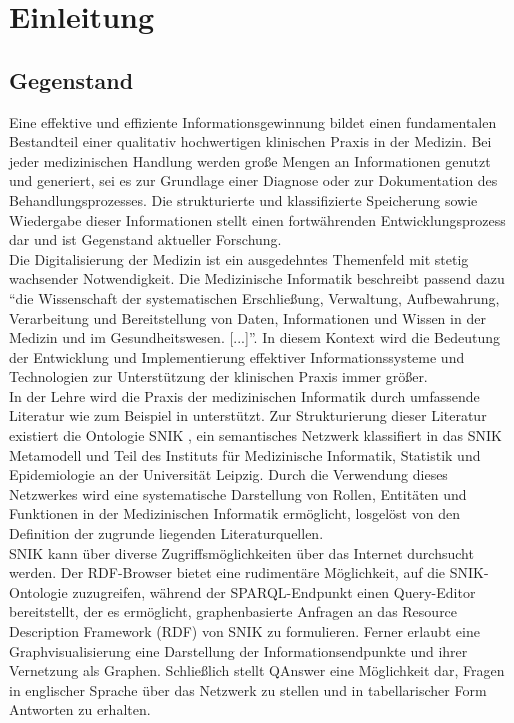 \chapter{Einleitung}\label{ch:introduction}
\section{Gegenstand}\label{sec:gegenstand}
Eine effektive und effiziente Informationsgewinnung bildet einen fundamentalen Bestandteil einer qualitativ hochwertigen klinischen Praxis in der Medizin. 
Bei jeder medizinischen Handlung werden große Mengen an Informationen genutzt und generiert, sei es zur Grundlage einer Diagnose oder zur Dokumentation des Behandlungsprozesses. 
Die strukturierte und klassifizierte Speicherung sowie Wiedergabe dieser Informationen stellt einen fortwährenden Entwicklungsprozess dar und ist Gegenstand aktueller Forschung.\\

Die Digitalisierung der Medizin ist ein ausgedehntes Themenfeld mit stetig wachsender Notwendigkeit. 
Die Medizinische Informatik beschreibt passend dazu \enquote{die Wissenschaft der systematischen Erschließung, Verwaltung, Aufbewahrung, Verarbeitung und Bereitstellung von Daten, Informationen und Wissen in der Medizin und im Gesundheitswesen. [...]}\citep{gmds}. 
In diesem Kontext wird die Bedeutung der Entwicklung und Implementierung effektiver Informationssysteme und Technologien zur Unterstützung der klinischen Praxis immer größer.\\

In der Lehre wird die Praxis der medizinischen Informatik durch umfassende Literatur wie zum Beispiel in \citet{bb} unterstützt. 
Zur Strukturierung dieser Literatur existiert die Ontologie SNIK \citep{snikgraphposter}, ein semantisches Netzwerk klassifiert in das SNIK Metamodell und Teil des Instituts für Medizinische Informatik, Statistik und Epidemiologie \citep{imise} an der Universität Leipzig.
Durch die Verwendung dieses Netzwerkes wird eine systematische Darstellung von Rollen, Entitäten und Funktionen in der Medizinischen Informatik ermöglicht, losgelöst von den Definition der zugrunde liegenden  Literaturquellen.\\

SNIK kann über diverse Zugriffsmöglichkeiten über das Internet durchsucht werden. Der RDF-Browser \citep{rfdbrowser} bietet eine rudimentäre Möglichkeit, auf die SNIK-Ontologie zuzugreifen,
während der SPARQL-Endpunkt \citep{sparqleditor} einen Query-Editor bereitstellt, der es ermöglicht, graphenbasierte Anfragen an das Resource Description Framework (RDF) von SNIK zu formulieren. 
Ferner erlaubt eine Graphvisualisierung \citep{graphvisual} eine Darstellung der Informationsendpunkte und ihrer Vernetzung als Graphen. Schließlich stellt QAnswer \citep{qanswer} eine Möglichkeit dar, Fragen in englischer Sprache über das Netzwerk zu stellen und in tabellarischer Form Antworten zu erhalten.


